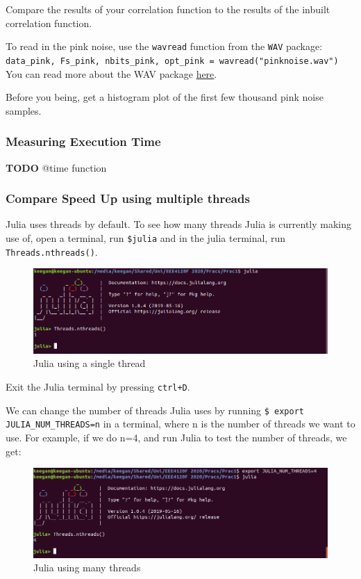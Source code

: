Compare the results of your correlation function to the results of the inbuilt correlation function.

To read in the pink noise, use the \verb|wavread| function from the \verb|WAV| package:\\
\verb|data_pink, Fs_pink, nbits_pink, opt_pink = wavread("pinknoise.wav")|
You can read more about the WAV package \href{https://github.com/dancasimiro/WAV.jl}{here}. 

Before you being, get a histogram plot of the first few thousand pink noise samples.

\subsubsection{Measuring Execution Time}
\textbf{TODO}
@time function

\subsubsection{Compare Speed Up using multiple threads}
Julia uses threads by default. To see how many threads Julia is currently making use of, open a terminal, run \verb|$julia| and in the julia terminal, run \verb|Threads.nthreads()|.

\begin{figure}[H]
\centering
\includegraphics[width=0.6\columnwidth]{Figures/julia-singlethread}
\caption{Julia using a single thread}
\label{fig:julia-singlethread}
\end{figure}

Exit the Julia terminal by pressing \verb|ctrl+D|.

We can change the number of threads Julia uses by running \verb|$ export JULIA_NUM_THREADS=n| in a terminal, where n is the number of threads we want to use. For example, if we do n=4, and run Julia to test the number of threads, we get:

\begin{figure}[H]
\centering
\includegraphics[width=0.6\columnwidth]{Figures/julia-manythreads}
\caption{Julia using many threads}
\label{fig:julia-manythreads}
\end{figure}


